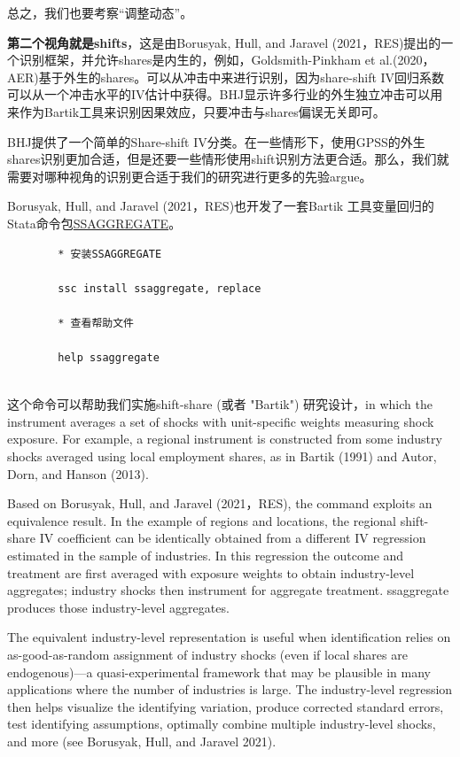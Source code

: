 \documentclass[cn,12pt,math=newtx,citestyle=gb7714-2015,bibstyle=gb7714-2015]{elegantbook}
\begin{document}
	总之，我们也要考察“调整动态”。
	
	
	\textbf{第二个视角就是shifts}，这是由Borusyak, Hull, and Jaravel (2021，RES)提出的一个识别框架，并允许shares是内生的，例如，Goldsmith-Pinkham et al.(2020，AER)基于外生的shares。可以从冲击中来进行识别，因为share-shift IV回归系数可以从一个冲击水平的IV估计中获得。BHJ显示许多行业的外生独立冲击可以用来作为Bartik工具来识别因果效应，只要冲击与shares偏误无关即可。
	
	BHJ提供了一个简单的Share-shift IV分类。在一些情形下，使用GPSS的外生shares识别更加合适，但是还要一些情形使用shift识别方法更合适。那么，我们就需要对哪种视角的识别更合适于我们的研究进行更多的先验argue。
	
	Borusyak, Hull, and Jaravel (2021，RES)也开发了一套Bartik
	工具变量回归的Stata命令包\href{https://ideas.repec.org/c/boc/bocode/s458526.html}{SSAGGREGATE}。
	
	\begin{lstlisting}
		* 安装SSAGGREGATE
		
		ssc install ssaggregate, replace
		
		* 查看帮助文件
		
		help ssaggregate
		
	\end{lstlisting}

这个命令可以帮助我们实施shift-share (或者 "Bartik") 研究设计，in which the instrument averages a set of shocks with unit-specific weights measuring shock exposure. For example, a regional instrument is constructed from some industry shocks averaged using local employment shares, as in Bartik (1991) and Autor, Dorn, and Hanson (2013).

Based on Borusyak, Hull, and Jaravel (2021，RES), the command exploits an equivalence result. In the example of regions and locations, the regional shift-share IV coefficient can be identically obtained from a different IV regression estimated in the sample of industries. In this regression the outcome and treatment are first averaged with exposure weights to obtain industry-level aggregates; industry shocks then instrument for aggregate treatment. ssaggregate produces those industry-level aggregates.

The equivalent industry-level representation is useful when identification relies on as-good-as-random assignment of industry shocks (even if local shares are endogenous)---a quasi-experimental framework that may be plausible in many applications where the number of industries is large. The industry-level regression then helps visualize the identifying variation, produce corrected standard errors, test identifying assumptions, optimally combine multiple industry-level shocks, and more (see Borusyak, Hull, and Jaravel 2021).
\end{document}

